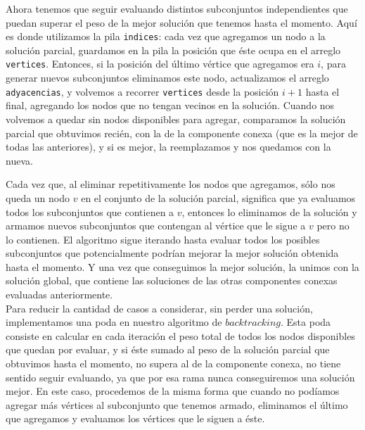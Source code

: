 \documentclass[a4paper, 10pt]{article}
\begin{document}
Ahora tenemos que seguir evaluando distintos subconjuntos independientes que puedan superar el peso de la mejor soluci\'on que tenemos hasta el momento. Aqu\'i es donde utilizamos la pila \texttt{indices}: cada vez que agregamos un nodo a la soluci\'on parcial, guardamos en la pila la posici\'on que \'este ocupa en el arreglo \texttt{vertices}. Entonces, si la posici\'on del \'ultimo v\'ertice que agregamos era $i$, para generar nuevos subconjuntos eliminamos este nodo, actualizamos el arreglo \texttt{adyacencias}, y volvemos a recorrer \texttt{vertices} desde la posici\'on $i+1$ hasta el final, agregando los nodos que no tengan vecinos en la soluci\'on. Cuando nos volvemos a quedar sin nodos disponibles para agregar, comparamos la soluci\'on parcial que obtuvimos reci\'en, con la de la componente conexa (que es la mejor de todas las anteriores), y si es mejor, la reemplazamos y nos quedamos con la nueva. \\

\newpage 

Cada vez que, al eliminar repetitivamente los nodos que agregamos, s\'olo nos queda un nodo $v$ en el conjunto de la soluci\'on parcial, significa que ya evaluamos todos los subconjuntos que contienen a $v$, entonces lo eliminamos de la soluci\'on y armamos nuevos subconjuntos que contengan al v\'ertice que le sigue a $v$ pero no lo contienen. El algoritmo sigue iterando hasta evaluar todos los posibles subconjuntos que potencialmente podr\'ian mejorar la mejor soluci\'on obtenida hasta el momento. Y una vez que conseguimos la mejor soluci\'on, la unimos con la soluci\'on global, que contiene las soluciones de las otras componentes conexas evaluadas anteriormente. \\

Para reducir la cantidad de casos a considerar, sin perder una soluci\'on, implementamos una poda en nuestro algoritmo de $backtracking$. Esta poda consiste en calcular en cada iteraci\'on el peso total de todos los nodos disponibles que quedan por evaluar, y si \'este sumado al peso de la soluci\'on parcial que obtuvimos hasta el momento, no supera al de la componente conexa, no tiene sentido seguir evaluando, ya que por esa rama nunca conseguiremos una soluci\'on mejor. En este caso, procedemos de la misma forma que cuando no pod\'iamos agregar m\'as v\'ertices al subconjunto que tenemos armado, eliminamos el \'ultimo que agregamos y evaluamos los v\'ertices que le siguen a \'este. \\
\end{document}
